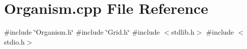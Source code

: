 \section{Organism.\+cpp File Reference}
\label{Organism_8cpp}
{\ttfamily \#include \char`\"{}Organism.\+h\char`\"{}}\newline
{\ttfamily \#include \char`\"{}Grid.\+h\char`\"{}}\newline
{\ttfamily \#include $<$stdlib.\+h$>$}\newline
{\ttfamily \#include $<$stdio.\+h$>$}\newline
